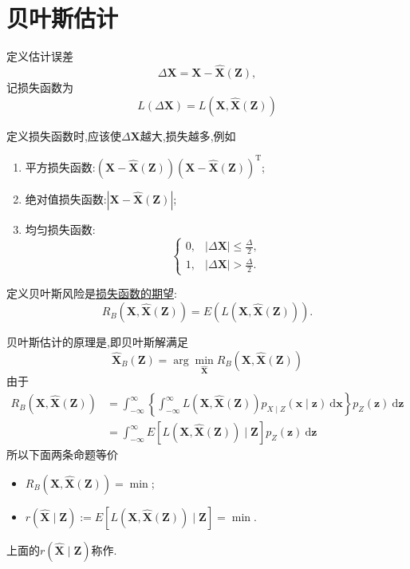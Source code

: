 \documentclass[cn,10pt,citestyle=gb7714-2015,bibstyle=gb7714-2015]{elegantbook}
\newcommand{\md}{\ \mathrm{d}}
\newcommand{\mT}{\mathrm{T}}
\begin{document}
\section{贝叶斯估计}
\begin{definition}[估计误差和损失函数]\label{Estimation-error&Loss-function}
  定义估计误差
  \begin{equation}
    \Delta\bm{X}=\bm{X}-\hat{\bm{X}}(\bm{Z}),
  \end{equation}
  记损失函数为
  \begin{equation}
    L(\Delta\bm{X})=L(\bm{X},\hat{\bm{X}}(\bm{Z}))
  \end{equation}
\end{definition}
定义损失函数时,应该使$\Delta\bm{X}$越大,损失越多,例如
\begin{enumerate}
  \item 平方损失函数:$(\bm{X}-\hat{\bm{X}}(\bm{Z}))(\bm{X}-\hat{\bm{X}}(\bm{Z}))^\mT$;
  \item 绝对值损失函数:$|\bm{X}-\hat{\bm{X}}(\bm{Z})|$;
  \item 均匀损失函数:
  \[
      \begin{cases}
        0,&|\Delta\bm{X}|\leqslant\frac{\Delta}{2},\\
        1,&|\Delta\bm{X}|>\frac{\Delta}{2}.
      \end{cases}
  \]
\end{enumerate}
\begin{definition}[贝叶斯风险]\label{def:Bayes-risk}
  定义贝叶斯风险是\uline{损失函数的期望}:
  \begin{equation}
    R_B(\bm{X},\hat{\bm{X}}(\bm{Z}))=E(L(\bm{X},\hat{\bm{X}}(\bm{Z}))).
  \end{equation}
\end{definition}
\begin{theorem}[贝叶斯估计准则]
贝叶斯估计的原理是,即贝叶斯解满足
\begin{equation}
  \hat{\bm{X}}_B(\bm{Z})=\arg\min_{\hat{\bm{X}}}R_B(\bm{X},\hat{\bm{X}}(\bm{Z}))
\end{equation}
由于
\begin{align*}
  R_B(\bm{X},\hat{\bm{X}}(\bm{Z}))&=\int_{-\infty}^\infty\!\left\{\int_{-\infty}^\infty L(\bm{X},\hat{\bm{X}}(\bm{Z}))p_{X\mid Z}(\bm{x}\mid\bm{z})\md\bm{x}\right\}p_Z(\bm{z})\md\bm{z}\\
  &=\int_{-\infty}^\infty E\left[L(\bm{X},\hat{\bm{X}}(\bm{Z}))\mid\bm{Z}\right]p_Z(\bm{z})\md\bm{z}
\end{align*}
所以下面两条命题等价
\begin{itemize}
  \item $R_B(\bm{X},\hat{\bm{X}}(\bm{Z}))=\min$;
  \item $r(\hat{\bm{X}}\mid\bm{Z}):=E\left[L(\bm{X},\hat{\bm{X}}(\bm{Z}))\mid\bm{Z}\right]=\min$.
\end{itemize} 
\end{theorem}
上面的$r(\hat{\bm{X}}\mid\bm{Z})$称作.  
\end{document}
